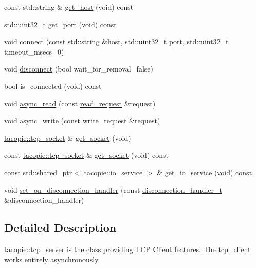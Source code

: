\begin{DoxyCompactItemize}
\item 
const std\+::string \& \hyperlink{classtacopie_1_1tcp__client_ad38ab710c5eca64de2f887abc455b15d}{get\+\_\+host} (void) const
\item 
std\+::uint32\+\_\+t \hyperlink{classtacopie_1_1tcp__client_a3b42ae2afe6d5ee5f2f16b8bd7846f37}{get\+\_\+port} (void) const
\item 
void \hyperlink{classtacopie_1_1tcp__client_a0cfbb18cb72aa3b6a41921f61cacc425}{connect} (const std\+::string \&host, std\+::uint32\+\_\+t port, std\+::uint32\+\_\+t timeout\+\_\+msecs=0)
\item 
void \hyperlink{classtacopie_1_1tcp__client_a7562e0bfa24912595d6f695f848b9e51}{disconnect} (bool wait\+\_\+for\+\_\+removal=false)
\item 
bool \hyperlink{classtacopie_1_1tcp__client_a9bf568812c8350260843842e7952c8c3}{is\+\_\+connected} (void) const
\item 
void \hyperlink{classtacopie_1_1tcp__client_a120e3ec2902acc902f7a0b27074bda6b}{async\+\_\+read} (const \hyperlink{structtacopie_1_1tcp__client_1_1read__request}{read\+\_\+request} \&request)
\item 
void \hyperlink{classtacopie_1_1tcp__client_a2304ed6d4ca0cbc74e6aa72d3e92b76a}{async\+\_\+write} (const \hyperlink{structtacopie_1_1tcp__client_1_1write__request}{write\+\_\+request} \&request)
\item 
\hyperlink{classtacopie_1_1tcp__socket}{tacopie\+::tcp\+\_\+socket} \& \hyperlink{classtacopie_1_1tcp__client_a1a3834deb1d263ec5816066f74286298}{get\+\_\+socket} (void)
\item 
const \hyperlink{classtacopie_1_1tcp__socket}{tacopie\+::tcp\+\_\+socket} \& \hyperlink{classtacopie_1_1tcp__client_a9cf1f3ccf43f9a0a883a17b15e3668d6}{get\+\_\+socket} (void) const
\item 
const std\+::shared\+\_\+ptr$<$ \hyperlink{classtacopie_1_1io__service}{tacopie\+::io\+\_\+service} $>$ \& \hyperlink{classtacopie_1_1tcp__client_aafbf0aa37cd0472778d09fb163362314}{get\+\_\+io\+\_\+service} (void) const
\item 
void \hyperlink{classtacopie_1_1tcp__client_a8c290d681186edb0578051c04f3c0762}{set\+\_\+on\+\_\+disconnection\+\_\+handler} (const \hyperlink{classtacopie_1_1tcp__client_aca5df52e5ee6fa673cf212532ada1453}{disconnection\+\_\+handler\+\_\+t} \&disconnection\+\_\+handler)
\end{DoxyCompactItemize}


\subsection{Detailed Description}
\hyperlink{classtacopie_1_1tcp__server}{tacopie\+::tcp\+\_\+server} is the class providing T\+CP Client features. The \hyperlink{classtacopie_1_1tcp__client}{tcp\+\_\+client} works entirely asynchronously 

